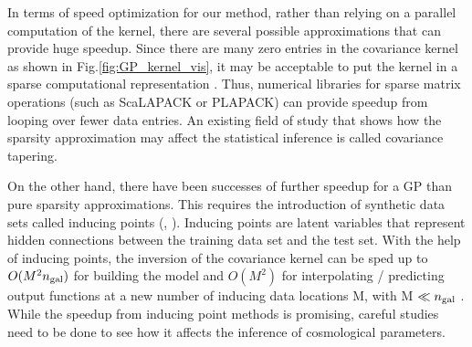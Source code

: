 In terms of speed optimization for our method, rather than relying on 
a parallel computation of the kernel, there are several 
possible approximations that can provide huge speedup. 
Since there are many zero entries in the covariance kernel as shown in
Fig.\ref{fig:GP_kernel_vis}, it may be acceptable to put the kernel in a sparse
computational representation \citep{Snelson2007}. 
Thus, numerical libraries for sparse matrix 
operations (such as {\sc ScaLAPACK} or {\sc PLAPACK})
can provide speedup from looping over fewer data entries. 
An existing field of study that shows how the sparsity
approximation may affect the statistical inference is called covariance tapering. 

On the other hand, there have been successes of further speedup for a GP than
pure sparsity approximations. This requires the introduction of  
 synthetic data sets called inducing points (\citealt{Snelson2006},
\citealt{Rasmussen2006}). Inducing points are latent variables that represent
hidden connections between the training data set and the test set. 
With the help 
of inducing points,
the inversion of the covariance kernel can be sped up to
$O(M^2 n_{\rm gal})$ for
building the model and $O(M^2)$ for interpolating / predicting output functions
at a new number of inducing data locations M, with M $\ll n_{\rm gal}$ 
\citep{Snelson2006}. While the speedup from inducing point methods is
promising, careful studies need to be done to see how it affects the
inference of cosmological parameters. 
  
